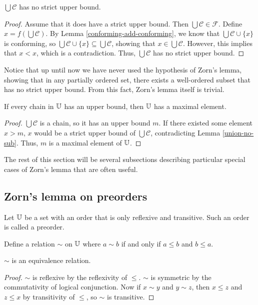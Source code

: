 \documentclass[../math.tex]{subfiles}
\begin{document}
\begin{lemma} \label{union-no-sub}
    $\bigcup \mathcal C$ has no strict upper bound.
\end{lemma}
\begin{proof}
    Assume that it does have a strict upper bound.  Then $\bigcup \mathcal C \in
    \mathcal F$.  Define $x = f(\bigcup \mathcal C)$.  By Lemma
    \ref{conforming-add-conforming}, we know that $\bigcup \mathcal C \cup
    \{x\}$ is conforming, so $\bigcup \mathcal C \cup \{x\} \subseteq \bigcup
    \mathcal C$, showing that $x \in \bigcup \mathcal C$.  However, this implies
    that $x < x$, which is a contradiction.  Thus, $\bigcup \mathcal C$ has no
    strict upper bound.
\end{proof}

Notice that up until now we have never used the hypothesis of Zorn's lemma,
showing that in any partially ordered set, there exists a well-ordered subset
that has no strict upper bound.  From this fact, Zorn's lemma itself is trivial.

\begin{theorem} \label{zorn}
    If every chain in $\mathbb{U}$ has an upper bound, then $\mathbb{U}$ has a maximal element.
\end{theorem}
\begin{proof}
    $\bigcup \mathcal C$ is a chain, so it has an upper bound $m$.  If there
    existed some element $x > m$, $x$ would be a strict upper bound of $\bigcup
    \mathcal C$, contradicting Lemma \ref{union-no-sub}.  Thus, $m$ is a maximal
    element of $\mathbb{U}$.
\end{proof}

The rest of this section will be several subsections describing particular
special cases of Zorn's lemma that are often useful.

\subsection{Zorn's lemma on preorders}

Let $\mathbb{U}$ be a set with an order that is only reflexive and transitive.  Such an
order is called a preorder.

\begin{definition}
    Define a relation $\sim$ on $\mathbb{U}$ where $a \sim b$ if and only if $a \leq b$
    and $b \leq a$.
\end{definition}

\begin{instance}
    $\sim$ is an equivalence relation.
\end{instance}
\begin{proof}
    $\sim$ is reflexive by the reflexivity of $\leq$.  $\sim$ is symmetric by
    the commutativity of logical conjunction.  Now if $x \sim y$ and $y \sim z$,
    then $x \leq z$ and $z \leq x$ by transitivity of $\leq$, so $\sim$ is
    transitive.
\end{proof}
\end{document}
